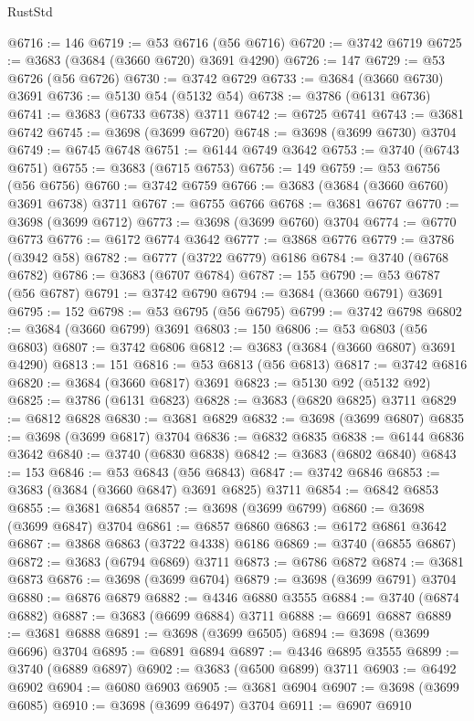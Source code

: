 \begin{lexlean}{RustStd}
\begin{coremodule}
{\begin{coremodule}
{{{{{{{{{{{{{{{{{{{{{{{{{{{{{{{{{{{{{{{{{{{{{{{@6716 := 146
@6719 := @53 @6716 (@56 @6716)
@6720 := @3742 @6719
@6725 := @3683 (@3684 (@3660 @6720) @3691 @4290)
@6726 := 147
@6729 := @53 @6726 (@56 @6726)
@6730 := @3742 @6729
@6733 := @3684 (@3660 @6730) @3691
@6736 := @5130 @54 (@5132 @54)
@6738 := @3786 (@6131 @6736)
@6741 := @3683 (@6733 @6738) @3711
@6742 := @6725 @6741
@6743 := @3681 @6742
@6745 := @3698 (@3699 @6720)
@6748 := @3698 (@3699 @6730) @3704
@6749 := @6745 @6748
@6751 := @6144 @6749 @3642
@6753 := @3740 (@6743 @6751)
@6755 := @3683 (@6715 @6753)
@6756 := 149
@6759 := @53 @6756 (@56 @6756)
@6760 := @3742 @6759
@6766 := @3683 (@3684 (@3660 @6760) @3691 @6738) @3711
@6767 := @6755 @6766
@6768 := @3681 @6767
@6770 := @3698 (@3699 @6712)
@6773 := @3698 (@3699 @6760) @3704
@6774 := @6770 @6773
@6776 := @6172 @6774 @3642
@6777 := @3868 @6776
@6779 := @3786 (@3942 @58)
@6782 := @6777 (@3722 @6779) @6186
@6784 := @3740 (@6768 @6782)
@6786 := @3683 (@6707 @6784)
@6787 := 155
@6790 := @53 @6787 (@56 @6787)
@6791 := @3742 @6790
@6794 := @3684 (@3660 @6791) @3691
@6795 := 152
@6798 := @53 @6795 (@56 @6795)
@6799 := @3742 @6798
@6802 := @3684 (@3660 @6799) @3691
@6803 := 150
@6806 := @53 @6803 (@56 @6803)
@6807 := @3742 @6806
@6812 := @3683 (@3684 (@3660 @6807) @3691 @4290)
@6813 := 151
@6816 := @53 @6813 (@56 @6813)
@6817 := @3742 @6816
@6820 := @3684 (@3660 @6817) @3691
@6823 := @5130 @92 (@5132 @92)
@6825 := @3786 (@6131 @6823)
@6828 := @3683 (@6820 @6825) @3711
@6829 := @6812 @6828
@6830 := @3681 @6829
@6832 := @3698 (@3699 @6807)
@6835 := @3698 (@3699 @6817) @3704
@6836 := @6832 @6835
@6838 := @6144 @6836 @3642
@6840 := @3740 (@6830 @6838)
@6842 := @3683 (@6802 @6840)
@6843 := 153
@6846 := @53 @6843 (@56 @6843)
@6847 := @3742 @6846
@6853 := @3683 (@3684 (@3660 @6847) @3691 @6825) @3711
@6854 := @6842 @6853
@6855 := @3681 @6854
@6857 := @3698 (@3699 @6799)
@6860 := @3698 (@3699 @6847) @3704
@6861 := @6857 @6860
@6863 := @6172 @6861 @3642
@6867 := @3868 @6863 (@3722 @4338) @6186
@6869 := @3740 (@6855 @6867)
@6872 := @3683 (@6794 @6869) @3711
@6873 := @6786 @6872
@6874 := @3681 @6873
@6876 := @3698 (@3699 @6704)
@6879 := @3698 (@3699 @6791) @3704
@6880 := @6876 @6879
@6882 := @4346 @6880 @3555
@6884 := @3740 (@6874 @6882)
@6887 := @3683 (@6699 @6884) @3711
@6888 := @6691 @6887
@6889 := @3681 @6888
@6891 := @3698 (@3699 @6505)
@6894 := @3698 (@3699 @6696) @3704
@6895 := @6891 @6894
@6897 := @4346 @6895 @3555
@6899 := @3740 (@6889 @6897)
@6902 := @3683 (@6500 @6899) @3711
@6903 := @6492 @6902
@6904 := @6080 @6903
@6905 := @3681 @6904
@6907 := @3698 (@3699 @6085)
@6910 := @3698 (@3699 @6497) @3704
@6911 := @6907 @6910
}}}}}}}}}}}}}}}}}}}}}}}}}}}}}}}}}}}}}}}}}}}}}}}
\end{coremodule}}
\end{coremodule}
\end{lexlean}
